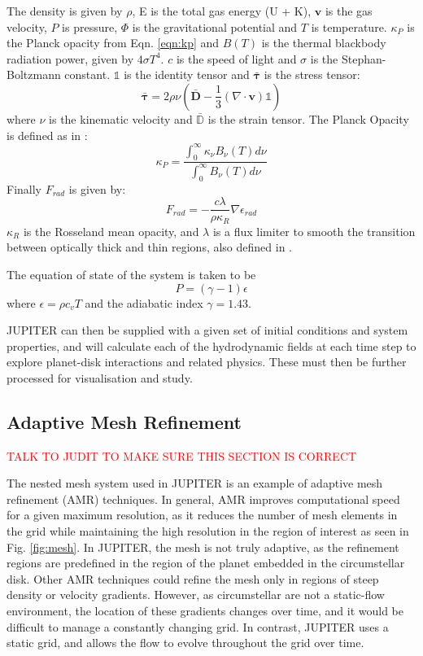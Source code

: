 \documentclass[twocolumn]{aastex62}
\begin{document}
The density is given by $\rho$, E is the total gas energy (U + K), $\mathbf{v}$ is the gas velocity, $P$ is pressure, $\Phi$ is the gravitational potential and $T$ is temperature. $\kappa_{P}$ is the Planck opacity from Eqn. \ref{eqn:kp} and $B(T)$ is the thermal blackbody radiation power, given by $4\sigma T^{4}$. $c$ is the speed of light and $\sigma$ is the Stephan-Boltzmann constant. $\mathds{1}$ is the identity tensor and $\bm{\bar{\tau}}$ is the stress tensor:
\begin{equation}
\bm{\bar{\tau}} = 2\rho\nu\left(\bm{\bar{D}} - \frac{1}{3}\left(\nabla\cdot\mathbf{v}\right)\mathds{1}\right)
\end{equation}
where $\nu$ is the kinematic velocity and $\mathds{\bar{D}}$ is the strain tensor. 
The Planck Opacity is defined as in \cite{Bitsch2013}:
\begin{equation}\label{eqn:kp}
\kappa_{P} = \frac{\int_{0}^{\infty}\kappa_{\nu}B_{\nu}\left(T\right)d\nu}{\int_{0}^{\infty}B_{\nu}\left(T\right)d\nu}
\end{equation}
Finally $F_{rad}$ is given by:
\begin{equation}
F_{rad} = -\frac{c\lambda}{\rho\kappa_{R}}\nabla\epsilon_{rad}
\end{equation}
$\kappa_{R}$ is the Rosseland mean opacity, and $\lambda$ is a flux limiter to smooth the transition between optically thick and thin regions, also defined in \cite{Bitsch2013}.

The equation of state of the system is taken to be 
\begin{equation}
P = \left(\gamma - 1\right)\epsilon
\end{equation}
where $\epsilon = \rho c_{v}T$ and the adiabatic index $\gamma = 1.43$.

JUPITER can then be supplied with a given set of initial conditions and system properties, and will calculate each of the hydrodynamic fields at each time step to explore planet-disk interactions and related physics. These must then be further processed for visualisation and study.
\subsection{Adaptive Mesh Refinement}\label{sec:amr}
\textcolor{red}{TALK TO JUDIT TO MAKE SURE THIS SECTION IS CORRECT}

The nested mesh system used in JUPITER is an example of adaptive mesh refinement (AMR) techniques. 
In general, AMR improves computational speed for a given maximum resolution, as it reduces the number of mesh elements in the grid while maintaining the high resolution in the region of interest as seen in Fig. \ref{fig:mesh}. 
In JUPITER, the mesh is not truly adaptive, as the refinement regions are predefined in the region of the planet embedded in the circumstellar disk.
Other AMR techniques could refine the mesh only in regions of steep density or velocity gradients. 
However, as circumstellar are not a static-flow environment, the location of these gradients changes over time, and it would be difficult to manage a constantly changing grid. 
In contrast, JUPITER uses a static grid, and allows the flow to evolve throughout the grid over time.
\end{document}
